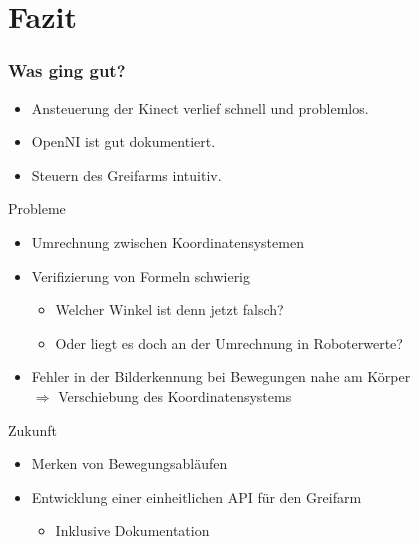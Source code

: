 \section{Fazit}
\begin{frame}
\frametitle{Was ging gut?}
\begin{itemize}
\item Ansteuerung der Kinect verlief schnell und problemlos.
\item OpenNI ist gut dokumentiert.
\item Steuern des Greifarms intuitiv.
\end{itemize}
\end{frame}

\begin{frame}{Probleme}
\begin{itemize}
	\item Umrechnung zwischen Koordinatensystemen
	\item Verifizierung von Formeln schwierig
		\begin{itemize}
		\item Welcher Winkel ist denn jetzt falsch?
		\item Oder liegt es doch an der Umrechnung in Roboterwerte?
		\end{itemize}
	\item Fehler in der Bilderkennung bei Bewegungen nahe am Körper\\$\Rightarrow$ Verschiebung des Koordinatensystems
\end{itemize}
\end{frame}


\begin{frame}{Zukunft}
	\begin{itemize}
	\item Merken von Bewegungsabläufen
	\item Entwicklung einer einheitlichen API für den Greifarm
		\begin{itemize}
		\item Inklusive Dokumentation
		\end{itemize}
	\end{itemize}
\end{frame}